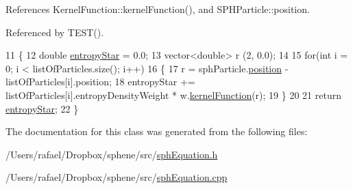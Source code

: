 References Kernel\+Function\+::kernel\+Function(), and S\+P\+H\+Particle\+::position.



Referenced by T\+E\+S\+T().


\begin{DoxyCode}
11 \{
12   \textcolor{keywordtype}{double} \hyperlink{classSPHEquation_ad2a1ebcbb1261faecd765825de4c729c}{entropyStar} = 0.0;
13   vector<double> r (2, 0.0);
14 
15   \textcolor{keywordflow}{for}(\textcolor{keywordtype}{int} i = 0; i < listOfParticles.size(); i++)
16   \{
17     r = sphParticle.\hyperlink{classSPHParticle_ac78fc2da202ad42875390dc4ad389d69}{position} - listOfParticles[i].position;
18     entropyStar += listOfParticles[i].entropyDensityWeight * w.\hyperlink{classKernelFunction_af6b299411c5cf913c03b919f9f691fa7}{kernelFunction}(r);
19   \}
20 
21   \textcolor{keywordflow}{return} \hyperlink{classSPHEquation_ad2a1ebcbb1261faecd765825de4c729c}{entropyStar};
22 \}
\end{DoxyCode}


The documentation for this class was generated from the following files\+:\begin{DoxyCompactItemize}
\item 
/\+Users/rafael/\+Dropbox/sphene/src/\hyperlink{sphEquation_8h}{sph\+Equation.\+h}\item 
/\+Users/rafael/\+Dropbox/sphene/src/\hyperlink{sphEquation_8cpp}{sph\+Equation.\+cpp}\end{DoxyCompactItemize}
